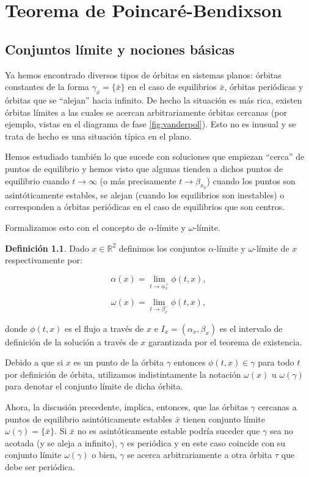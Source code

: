 \documentclass[11pt]{book}
\theoremstyle{definition}
\newtheorem{definition}{Definición}
\numberwithin{definition}{section}
\theoremstyle{theorem}
\numberwithin{theorem}{section}
\numberwithin{lemma}{section}
\numberwithin{corollary}{section}
\theoremstyle{plain}
\numberwithin{example}{section}
\newcommand{\R}{{\ensuremath{\mathbb{R}}}}
\begin{document}
\chapter{Teorema de Poincaré-Bendixson}

\section{Conjuntos límite y nociones básicas}

Ya hemos encontrado diversos tipos de órbitas en sistemas planos: órbitas constantes de la forma $\gamma_{\bar{x}} = \{\bar{x}\}$ en el caso de equilibrios $\bar{x}$, órbitas periódicas y órbitas que se ``alejan'' hacia infinito.
De hecho la situación es más rica, existen órbitas límites a las cuales se acercan arbitrariamente órbitas cercanas (por ejemplo, vistas en el diagrama de fase \ref{fig:vanderpol}). Esto no es inusual y se trata de hecho es una situación típica en el plano.

Hemos estudiado también lo que sucede con soluciones que empiezan ``cerca'' de puntos de equilibrio y hemos visto que algunas tienden a dichos puntos de equilibrio cuando $t \to \infty$ (o más precisamente $t \to \beta_{x_0}$) cuando los puntos son asintóticamente estables, se alejan (cuando los equilibrios son inestables) o corresponden a órbitas periódicas en el caso de equilibrios que son centros.

Formalizamos esto con el concepto de $\alpha$-límite y $\omega$-límite.

\begin{definition}Dado $x \in \R^2$ definimos los conjuntos $\alpha$-límite y $\omega$-límite de $x$ respectivamente por:

$$
	\alpha(x) = \lim_{t \to \alpha_{x}^+}{\phi(t,x)},
$$

$$
	\omega(x) = \lim_{t \to \beta_{x}^-}{\phi(t,x)},
$$

donde $\phi(t,x)$ es el flujo a través de $x$ e $I_x = (\alpha_x, \beta_x)$ es el intervalo de definición de la solución a través de $x$ garantizada por el teorema de existencia.
\end{definition}

Debido a que si $x$ es un punto de la órbita $\gamma$ entonces $\phi(t,x) \in \gamma$ para todo $t$ por definición de órbita, utilizamos indistintamente la notación $\omega(x)$ u $\omega(\gamma)$ para denotar el conjunto límite de dicha órbita.

Ahora, la discusión precedente, implica, entonces, que las órbitas $\gamma$ cercanas a puntos de equilibrio asintóticamente estables $\bar{x}$ tienen conjunto límite $\omega(\gamma) = \{\bar{x}\}$. Si $\bar{x}$ no es asintóticamente estable podría suceder que $\gamma$ sea no acotada (y se aleja a infinito), $\gamma$ es periódica y en este caso coincide con su conjunto límite $\omega(\gamma)$ o bien, $\gamma$ se acerca arbitrariamente a otra órbita $\tau$ que debe ser periódica.
\end{document}
